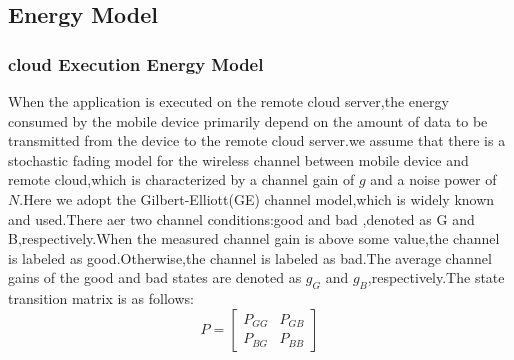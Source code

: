 \documentclass[review]{elsarticle}
\begin{document}
        \subsection{Energy Model}
            \subsubsection{cloud Execution Energy Model}
             \noindent When the application is executed on the remote cloud server,the energy consumed by the mobile device primarily depend on the amount of data to be transmitted from the device to the remote cloud server.we assume that there is a stochastic fading model for the wireless channel between mobile device and remote cloud,which is characterized by a channel gain of \begin{math}g\end{math} and a noise power of \begin{math} N\end{math}.Here we adopt the Gilbert-Elliott(GE) channel model\citep{zafer2007minimum},which is widely known and used.There aer two channel conditions:good and bad ,denoted as G and B,respectively.When the measured channel gain is above some value,the channel is labeled as good.Otherwise,the channel is labeled as bad.The average channel gains of the good and bad states are denoted as  \begin{math}g_{G}\end{math} and  \begin{math}g_{B}\end{math},respectively.The state transition matrix is as follows: \\
             $$P=\begin{bmatrix}P_{GG} & P_{GB} \\P_{BG} &P_{BB} \end{bmatrix}$$
\end{document}
